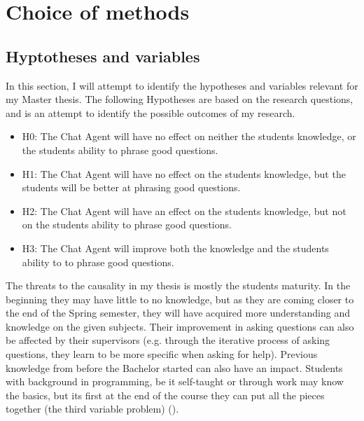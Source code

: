 \chapter{Choice of methods}
\label{chapter4:choice_of_methods}

\section{Hyptotheses and variables}
\label{chapter4:hypotheses_variables}
In this section, I will attempt to identify the hypotheses and variables relevant for my Master thesis. The following Hypotheses are based on the research questions, 
and is an attempt to identify the possible outcomes of my research.
\begin{itemize}
	\item H0: The Chat Agent will have no effect on neither the students knowledge, 
	or the students ability to phrase good questions.
	\item H1: The Chat Agent will have no effect on the students knowledge, 
	but the students will be better at phrasing good questions.
	\item H2: The Chat Agent will have an effect on the students knowledge, 
	but not on the students ability to phrase good questions.
	\item H3: The Chat Agent will improve both the knowledge 
	and the students ability to to phrase good questions.
\end{itemize}
The threats to the causality in my thesis is mostly the students maturity. In the beginning they may have little to no knowledge, but as they are coming closer to 
the end of the Spring semester, they will have acquired more understanding and knowledge on the given subjects. Their improvement in asking questions can also be 
affected by their supervisors (e.g. through the iterative process of asking questions, they learn to be more specific when asking for help). Previous knowledge from 
before the Bachelor started can also have an impact. Students with background in programming, be it self-taught or through work may know the basics, but its first 
at the end of the course they can put all the pieces together (the third variable problem) (\citet{Tafliovich2013}). 

